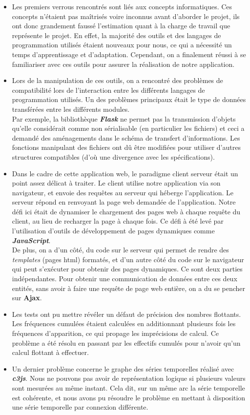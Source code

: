 			\begin{itemize}[leftmargin=*]
				\item Les premiers verrous rencontrés sont liés aux concepts informatiques. Ces concepts n'étaient pas maîtrisés voire inconnus avant d'aborder le projet, ils ont donc grandement faussé l'estimation quant à la charge de travail que représente le projet. En effet, la majorité des outils et des langages de programmation utilisés étaient nouveaux pour nous, ce qui a nécessité un temps d'apprentissage et d'adaptation. Cependant, on a finalement réussi à se familiariser avec ces outils pour assurer la réalisation de notre application.
				\item Lors de la manipulation de ces outils, on a rencontré des problèmes de compatibilité lors de l'interaction entre les différents langages de programmation utilisés. Un des problèmes principaux était le type de données transférées entre les différents modules.\\
				Par exemple, la bibliothèque \textit{\textbf{Flask}} ne permet pas la transmission d'objets qu'elle considérait comme non sérialisable (en particulier les fichiers) et ceci a demandé des aménagements dans le schéma de transfert d'informations. Les fonctions manipulant des fichiers ont dû être modifiées pour utiliser d'autres structures compatibles (d'où une divergence avec les spécifications).
				\item Dans le cadre de cette application web, le paradigme client serveur était un point assez délicat à traiter. Le client utilise notre application via son navigateur, et envoie des requêtes au serveur qui héberge l'application. Le serveur répond en renvoyant la page web demandée de l'application. Notre défi ici était de dynamiser le chargement des pages web à chaque requête du client, au lieu de recharger la page à chaque fois. Ce défi à été levé par l'utilisation d'outils de développement de pages dynamiques comme \textbf{\textit{JavaScript}}.\\
				De plus, on a d'un côté, du code sur le serveur qui permet de rendre des \textit{templates} (pages html) formatés, et d'un autre côté du code sur le navigateur qui peut s'exécuter pour obtenir des pages dynamiques. Ce sont deux parties indépendantes. Pour obtenir une communication de données entre ces deux entités, sans avoir à faire une requête de page web entière, on a du se pencher sur \textbf{Ajax}.
				\item Les tests ont pu mettre révéler un défaut de précision des nombres flottants. Les fréquences cumulées étaient calculées en additionnant plusieurs fois les fréquences d'apparition, ce qui propage les imprécisions de calcul. Ce problème a été résolu en passant par les effectifs cumulés pour n'avoir qu'un calcul flottant à effectuer.
				\item Un dernier problème concerne le graphe des séries temporelles réalisé avec \textit{\textbf{c3js}}. Nous ne pouvons pas avoir de représentation logique si plusieurs valeurs sont mesurées au même instant. Cela dit, sur un même arc la série temporelle est cohérente, et nous avons pu résoudre le problème en mettant à disposition une série temporelle par connexion différente.
			\end{itemize}
				
